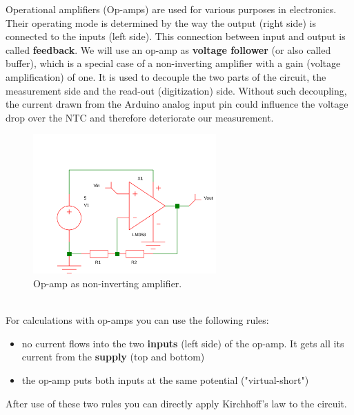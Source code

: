 Operational amplifiers (Op-amps) are used for various purposes in electronics. Their operating mode is determined by the way the output (right side) is connected to the inputs (left side). This connection between input and output is called \textbf{feedback}. We will use an op-amp as \textbf{voltage follower} (or also called buffer), which is a special case of a non-inverting amplifier with a gain (voltage amplification) of one. It is used to decouple the two parts of the circuit, the measurement side and the read-out (digitization) side. Without such decoupling, the current drawn from the Arduino analog input pin could influence the voltage drop over the NTC and therefore deteriorate our measurement.

\begin{figure}[H]
\begin{center}
\includegraphics[width=7cm]{opamp}
\caption{Op-amp as non-inverting amplifier.}\label{fig:opamp}
\end{center}
\end{figure}

\vspace{0.5cm}\\
For calculations with op-amps you can use the following rules:
\begin{itemize}
\item no current flows into the two \textbf{inputs} (left side) of the op-amp. It gets all its current from the \textbf{supply} (top and bottom)
\item the op-amp puts both inputs at the same potential ("virtual-short")
\end{itemize}

After use of these two rules you can directly apply Kirchhoff's law to the circuit. 

